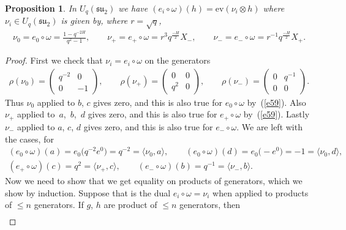 \documentclass[10pt,a4paper]{amsart}
\numberwithin{equation}{section}
\newtheorem{Proposition}[Theorem]{Proposition}
 { \theoremstyle{definition}
\newtheorem{Definition}[Theorem]{Definition}
\newtheorem{Note}[Theorem]{Note}
\newtheorem{Example}[Theorem]{Example}
\newtheorem{Remark}[Theorem]{Remark} }
\newcommand{\ev}{\mathrm{ev}}
\newcommand{\tens}{\mathop{\otimes}}
\newcommand{\<}{\langle}
\renewcommand{\>}{\rangle}
\begin{document}
\begin{Proposition}\label{P5}
	In $ U_{q}({\mathfrak{su}}_{2}) $ we have $ (e_{i}\circ \omega )(h) =	\ev (\nu_{i} \tens h)$ where $ \nu_{i} \in U_{q}({\mathfrak{su}}_{2}) $ is given by, where $ r=\sqrt{q} $,
	\begin{gather*}
		\nu_{0}=e_{0}\circ \omega=\frac{1-q^{-2H}}{q^{2}-1}, \qquad \nu_{+}=e_{+}\circ\omega= r^{3} q^{\frac{-H}{2}} X_{-}, \qquad 	\nu_{-}=e_{-}\circ \omega= r^{-1}q^{\frac{-H}{2}} X_{+}.
	\end{gather*}
\end{Proposition}
\begin{proof}
	First we check that $\nu_{i}=e_{i}\circ \omega $ on the generators
		\begin{gather*}%
		\rho (\nu_{0})= \left( \begin{matrix}
		q^{-2}& 0\\
			0& -1
		\end{matrix} \right), \qquad\rho (\nu _{+} )= \left( \begin{matrix}
			0& 0 \\
			q^{2}& 0
		\end{matrix} \right), \qquad \rho (\nu_{-})= \left( \begin{matrix}
			0& q^{-1} \\
			0& 0
		\end{matrix} \right)  .
	\end{gather*}
Thus $ \nu_{0} $ applied to $ b$, $c $ gives zero, and this is also true for $ e_{0}\circ\omega$ by~(\ref{e59}).
Also $ \nu_{+} $ applied to~$a$,~$b$,~$d $ gives zero, and this is also true for $ e_{+}\circ \omega$ by~(\ref{e59}). Lastly $ \nu_{-} $ applied to $a$, $c$, $d $ gives zero, and this is also true for $ e_{-}\circ \omega$. We are left with the cases, for
\begin{gather}
		(e_{0}\circ\omega)(a)=e_{0}\big(q^{-2} e^{0}\big)= q^{-2}= \langle \nu_{0}, a \rangle, \qquad
	(e_{0}\circ\omega)(d)=e_{0}\big({-}e^{0}\big)= -1= \langle \nu_{0}, d \rangle,\nonumber\\
	(	e_{+}\circ\omega)(c)= q^{2}= \langle \nu_{+},c\rangle, \qquad
	(e_{-}\circ\omega)(b)= q^{-1}= \langle \nu_{-},b \rangle .\label{e62}
\end{gather}
Now we need to show that we get equality on products of generators, which we show by induction. Suppose that is the dual $ e_{i} \circ \omega =\nu_{i}$ when applied to products of $ \leq n $ generators.
If $ g$, $h $ are product of $ \leq n $ generators, then
\begin{gather*}

\end{gather*}
\end{proof}
\end{document}
